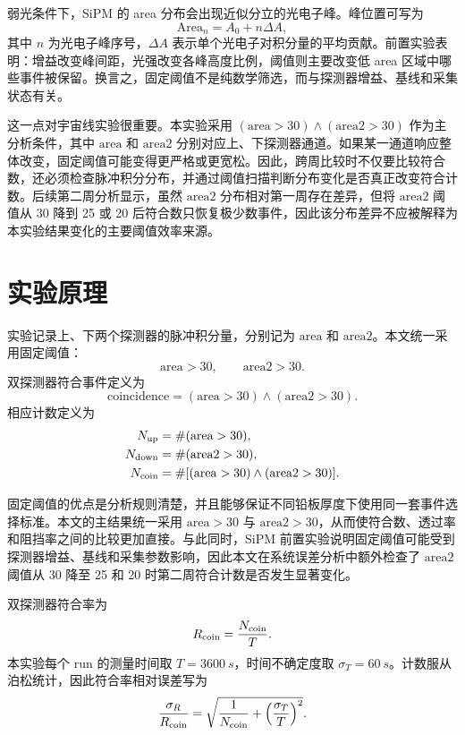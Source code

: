 \documentclass[aps,prl,twocolumn,superscriptaddress,nofootinbib]{revtex4-2}
\begin{document}
弱光条件下，SiPM 的 area 分布会出现近似分立的光电子峰。峰位置可写为
\begin{equation}
\mathrm{Area}_n=A_0+n\Delta A ,
\end{equation}
其中 \(n\) 为光电子峰序号，\(\Delta A\) 表示单个光电子对积分量的平均贡献。前置实验表明：增益改变峰间距，光强改变各峰高度比例，阈值则主要改变低 area 区域中哪些事件被保留。换言之，固定阈值不是纯数学筛选，而与探测器增益、基线和采集状态有关。

这一点对宇宙线实验很重要。本实验采用 \((\mathrm{area}>30)\land(\mathrm{area2}>30)\) 作为主分析条件，其中 \(\mathrm{area}\) 和 \(\mathrm{area2}\) 分别对应上、下探测器通道。如果某一通道响应整体改变，固定阈值可能变得更严格或更宽松。因此，跨周比较时不仅要比较符合数，还必须检查脉冲积分分布，并通过阈值扫描判断分布变化是否真正改变符合计数。后续第二周分析显示，虽然 \(\mathrm{area2}\) 分布相对第一周存在差异，但将 \(\mathrm{area2}\) 阈值从 30 降到 25 或 20 后符合数只恢复极少数事件，因此该分布差异不应被解释为本实验结果变化的主要阈值效率来源。

\section{实验原理}

实验记录上、下两个探测器的脉冲积分量，分别记为 $\mathrm{area}$ 和 $\mathrm{area2}$。本文统一采用固定阈值：
\begin{equation}
\mathrm{area}>30,\qquad \mathrm{area2}>30 .
\end{equation}
双探测器符合事件定义为
\begin{equation}
\mathrm{coincidence}=(\mathrm{area}>30)\land(\mathrm{area2}>30).
\end{equation}
相应计数定义为
\begin{align}
N_{\rm up} &= \#(\mathrm{area}>30),\\
N_{\rm down} &= \#(\mathrm{area2}>30),\\
N_{\rm coin} &= \#[(\mathrm{area}>30)\land(\mathrm{area2}>30)].
\end{align}

固定阈值的优点是分析规则清楚，并且能够保证不同铅板厚度下使用同一套事件选择标准。本文的主结果统一采用 \(\mathrm{area}>30\) 与 \(\mathrm{area2}>30\)，从而使符合数、透过率和阻挡率之间的比较更加直接。与此同时，SiPM 前置实验说明固定阈值可能受到探测器增益、基线和采集参数影响，因此本文在系统误差分析中额外检查了 \(\mathrm{area2}\) 阈值从 30 降至 25 和 20 时第二周符合计数是否发生显著变化。

双探测器符合率为
\begin{equation}
R_{\rm coin}=\frac{N_{\rm coin}}{T}.
\end{equation}
本实验每个 run 的测量时间取 $T=\SI{3600}{s}$，时间不确定度取 $\sigma_T=\SI{60}{s}$。计数服从泊松统计，因此符合率相对误差写为
\begin{equation}
\frac{\sigma_R}{R_{\rm coin}}
=\sqrt{\frac{1}{N_{\rm coin}}+\left(\frac{\sigma_T}{T}\right)^2}.
\end{equation}
\end{document}
